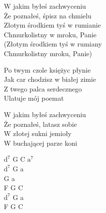 
\begin{text}
    W jakim byłeś zachwyceniu\\
    Że poznałeś, śpisz na chmielu\\
    Złotym środkiem tyś w rumianie\\
    Chmurkolistny w mroku, Panie\\
    (Złotym środkiem tyś w rumiany\\
    Chmurkolistny mroku, Panie)

    Po twym czole księżyc płynie\\
    Jak car chodzisz w białej zimie\\
    Z twego palca serdecznego\\
    Ulatuje mój poemat

    W jakim byłeś zachwyceniu\\
    Że poznałeś, latasz sobie\\
    W złotej sukni jemioły\\
    W buchającej parze koni
\end{text}
\begin{chord}
    $\mathrm{d^7}$ G C $\mathrm{a^7}$\\
    $\mathrm{d^7}$ G a\\
    G a\\
    F G C\\
    $\mathrm{d^7}$ G a\\
    F G C
\end{chord}
